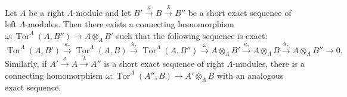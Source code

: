 Let $A$ be a right $\Lambda$-module and let $B' \xrightarrow{\kappa} B \xrightarrow{\lambda} B''$ be a short exact sequence of left $\Lambda$-modules. Then there exists a connecting homomorphism $\omega : \operatorname{Tor}^\Lambda(A, B'') \to A \otimes_\Lambda B'$ such that the following sequence is exact:
$$
\operatorname{Tor}^\Lambda(A, B') \xrightarrow{\kappa_*} \operatorname{Tor}^\Lambda(A, B) \xrightarrow{\lambda_*} \operatorname{Tor}^\Lambda(A, B'') \xrightarrow{\omega} A \otimes_\Lambda B' \xrightarrow{\kappa_*} A \otimes_\Lambda B \xrightarrow{\lambda_*} A \otimes_\Lambda B'' \to 0.
$$
Similarly, if $A' \xrightarrow{\kappa} A \xrightarrow{\lambda} A''$ is a short exact sequence of right $\Lambda$-modules, there is a connecting homomorphism $\omega : \operatorname{Tor}^\Lambda(A'', B) \to A' \otimes_\Lambda B$ with an analogous exact sequence.
